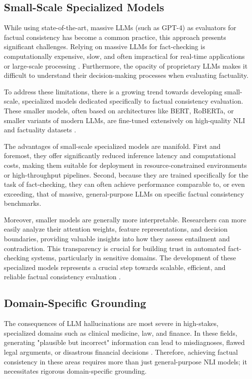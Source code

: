 \documentclass[11pt,a4paper]{article}
\begin{document}
\subsection{Small-Scale Specialized Models}

While using state-of-the-art, massive LLMs (such as GPT-4) as evaluators for factual consistency has become a common practice, this approach presents significant challenges. Relying on massive LLMs for fact-checking is computationally expensive, slow, and often impractical for real-time applications or large-scale processing . Furthermore, the opacity of proprietary LLMs makes it difficult to understand their decision-making processes when evaluating factuality.

To address these limitations, there is a growing trend towards developing small-scale, specialized models dedicated specifically to factual consistency evaluation. These smaller models, often based on architectures like BERT, RoBERTa, or smaller variants of modern LLMs, are fine-tuned extensively on high-quality NLI and factuality datasets \cite{Agarwal_2024_Zero}.

The advantages of small-scale specialized models are manifold. First and foremost, they offer significantly reduced inference latency and computational costs, making them suitable for deployment in resource-constrained environments or high-throughput pipelines. Second, because they are trained specifically for the task of fact-checking, they can often achieve performance comparable to, or even exceeding, that of massive, general-purpose LLMs on specific factual consistency benchmarks.

Moreover, smaller models are generally more interpretable. Researchers can more easily analyze their attention weights, feature representations, and decision boundaries, providing valuable insights into how they assess entailment and contradiction. This transparency is crucial for building trust in automated fact-checking systems, particularly in sensitive domains. The development of these specialized models represents a crucial step towards scalable, efficient, and reliable factual consistency evaluation .

\subsection{Domain-Specific Grounding}

The consequences of LLM hallucinations are most severe in high-stakes, specialized domains such as clinical medicine, law, and finance. In these fields, generating "plausible but incorrect" information can lead to misdiagnoses, flawed legal arguments, or disastrous financial decisions \cite{Aghaebrahimian_2025_Aligncheck}. Therefore, achieving factual consistency in these areas requires more than just general-purpose NLI models; it necessitates rigorous domain-specific grounding.
\end{document}
